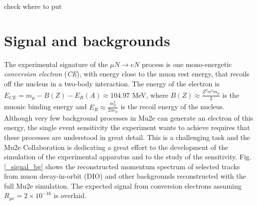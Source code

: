 \documentclass[12pt,a4paper,openright, oneside, titlepage]{book} %
\begin{document}
check where to put \cite{Measday:2001}




\section{Signal and backgrounds}

The experimental signature of the $\mu N \rightarrow eN$ process is one mono-energetic  \textit{conversion electron} (\textit{CE}), with energy close to the muon rest energy, that recoils off the nucleus in a two-body interaction.
The energy of the electron is $E_{CE} = m_\mu -B(Z) -E_R(A) \approx 104.97$ MeV, where  $B(Z)\approx\frac{Z^2\alpha^2m_\mu}{2}$ is the muonic binding energy  and $E_R\approx\frac{m_\mu^2}{2m_N}$ is the recoil energy of the nucleus.
Although very few background processes in Mu2e can generate an electron of this energy, the single event sensitivity the experiment wants to achieve requires that these processes are understood in great detail. 
This is a challenging task and the Mu2e Collaboration is dedicating a great effort to the development of the simulation of the experimental apparatus and to the study of the sensitivity. 
Fig. \ref{_signal_bg} shows the reconstructed momentum spectrum of selected tracks from muon decay-in-orbit (DIO) and other backgrounds reconstructed with the full Mu2e simulation. 
The expected signal from conversion electrons assuming $R_{\mu e} = 2 \times 10^{-16}$ is overlaid. 
\end{document}
